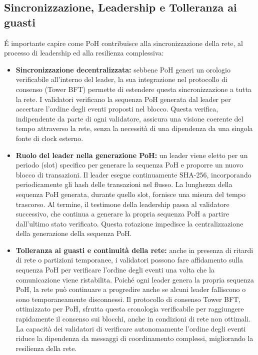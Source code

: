 \documentclass[a4paper,12pt]{report}
\begin{document}
	\subsection{Sincronizzazione, Leadership e Tolleranza ai guasti}
	É importante capire come PoH contribuisce alla sincronizzazione della rete, al processo di leadership ed alla resilienza complessiva:
	\begin{itemize}
		\item \textbf{Sincronizzazione decentralizzata:} sebbene PoH generi un orologio verificabile all'interno del leader, la sua integrazione nel protocollo di consenso (Tower BFT) permette di estendere questa sincronizzazione a tutta la rete. I validatori verificano la sequenza PoH generata dal leader per accertare l'ordine degli eventi proposti nel blocco. Questa verifica, indipendente da parte di ogni validatore, assicura una visione coerente del tempo attraverso la rete, senza la necessità di una dipendenza da una singola fonte di clock esterno.
		\item \textbf{Ruolo del leader nella generazione PoH:} un leader viene eletto per un periodo (slot) specifico per generare la sequenza PoH e proporre un nuovo blocco di transazioni. Il leader esegue continuamente SHA-256, incorporando periodicamente gli hash delle transazioni nel flusso. La lunghezza della sequenza PoH generata, durante quello slot, fornisce una misura del tempo trascorso. Al termine, il testimone della leadership passa al validatore successivo, che continua a generare la propria sequenza PoH a partire dall'ultimo stato verificato. Questa rotazione impedisce la centralizzazione della generazione della sequenza PoH.
		\item \textbf{Tolleranza ai guasti e continuità della rete:} anche in presenza di ritardi di rete o partizioni temporanee, i validatori possono fare affidamento sulla sequenza PoH per verificare l'ordine degli eventi una volta che la comunicazione viene ristabilita. Poiché ogni leader genera la propria sequenza PoH, la rete può continuare a progredire anche se alcuni leader falliscono o sono temporaneamente disconnessi. Il protocollo di consenso Tower BFT, ottimizzato per PoH, sfrutta questa cronologia verificabile per raggiungere rapidamente il consenso sui blocchi, anche in condizioni di rete non ottimali. La capacità dei validatori di verificare autonomamente l'ordine degli eventi riduce la dipendenza da messaggi di coordinamento complessi, migliorando la resilienza della rete.
	\end{itemize}
	
\end{document}
